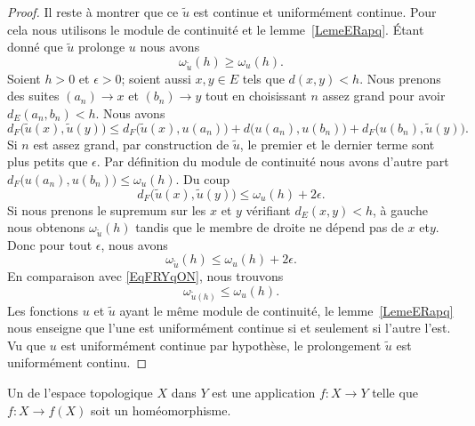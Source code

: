 \begin{proof}
	Il reste à montrer que ce \( \tilde u\) est continue et uniformément continue. Pour cela nous utilisons le module de continuité et le lemme~\ref{LemeERapq}. Étant donné que \( \tilde u\) prolonge \( u\) nous avons
	\begin{equation}        \label{EqFRYqON}
		\omega_{\tilde u}(h)\geq \omega_u(h).
	\end{equation}
	Soient \( h>0\) et \( \epsilon>0\); soient aussi \( x,y\in E\) tels que \( d(x,y)<h\). Nous prenons des suites \( (a_n)\to x\) et \( (b_n)\to y\) tout en choisissant \( n\) assez grand pour avoir \( d_E(a_n,b_n)<h\). Nous avons
	\begin{equation}
		d_F\big( \tilde u(x),\tilde u(y) \big)\leq d_F\big( \tilde u(x),u(a_n) \big)+d\big( u(a_n),u(b_n) \big)+d_F\big( u(b_n),\tilde u(y) \big).
	\end{equation}
	Si \( n\) est assez grand, par construction de \( \tilde u\), le premier et le dernier terme sont plus petits que \( \epsilon\). Par définition du module de continuité nous avons d'autre part \( d_F\big( u(a_n),u(b_n) \big)\leq \omega_u(h)\). Du coup
	\begin{equation}
		d_F\big( \tilde u(x),\tilde u(y) \big)\leq \omega_u(h)+2\epsilon.
	\end{equation}
	Si nous prenons le supremum sur les \( x\) et \( y\) vérifiant \( d_E(x,y)<h\), à gauche nous obtenons \( \omega_{\tilde u}(h)\) tandis que le membre de droite ne dépend pas de \( x\) et\( y\). Donc pour tout \( \epsilon\), nous avons
	\begin{equation}
		\omega_{\tilde u}(h)\leq \omega_u(h)+2\epsilon.
	\end{equation}
	En comparaison avec \eqref{EqFRYqON}, nous trouvons
	\begin{equation}
		\omega_{\tilde u(h)}\leq \omega_u(h).
	\end{equation}
	Les fonctions \( u\) et \( \tilde u\) ayant le même module de continuité, le lemme~\ref{LemeERapq} nous enseigne que l'une est uniformément continue si et seulement si l'autre l'est. Vu que \( u\) est uniformément continue par hypothèse, le prolongement \( \tilde u\) est uniformément continu.
\end{proof}

\begin{definition}      \label{DEFooMHQMooEvLccV}
	Un  de l'espace topologique \( X\) dans \( Y\) est une application \( f\colon X\to Y\) telle que \( f\colon X\to f(X)\) soit un homéomorphisme.
\end{definition}

